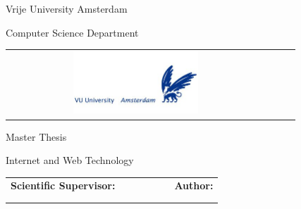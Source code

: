 \begin{titlepage}
	\begin{center}
		{\Large Vrije University Amsterdam}
		\par\vspace*{1mm}
		{\Large Computer Science Department}
		\par\vspace*{0mm}
		\begin{table}[h]
        	\begin{center}
				\begin{tabular}{cccc}
                    
					\includegraphics[width=0.50\textwidth]{src/img/branding/vrije}
            	\end{tabular}
		\end{center}
		\end{table}
		
		\par\vspace*{25mm}
		
		\textbf{{\Huge \VARtitleen }}
		\par\vspace*{5mm}
		{\Large Master Thesis}\\
		\par\vspace*{2mm}
		{\Large Internet and Web Technology}
		\par\vspace*{15mm}
		\begin{table}[h]
        	\begin{center}
				\begin{tabular}{lcccccl}
					\Large \textbf{\Large Scientific Supervisor:}
					\vspace*{1mm} &&&&&& \Large \textbf{\Large Author:}\vspace*{1mm} \\
					\Large \VARadviser &&&&&& \Large \VARauthor\\
					&&&&&& \Large \VARstudentnumber
				\end{tabular}
			\end{center}
		\end{table}

		\par\vspace*{50mm}
		\Large \VARtitlefooteren
	\end{center}
\end{titlepage}

